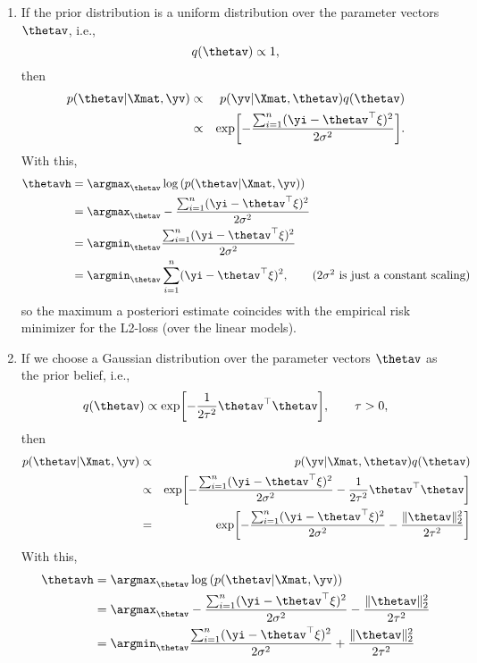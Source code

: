 \begin{enumerate}
%	
  \item  If the prior distribution is  a uniform distribution over the parameter vectors $\thetav$, i.e.,
%  
	$$  q(\thetav)  \propto 1, $$
%	
	then 
%	
	\begin{eqnarray*}
		p(\thetav | \Xmat, \yv) &\propto& p(\yv | \Xmat, \thetav) q(\thetav) \\
%		
		&\propto& \exp\biggl[-\frac{ \sum_{i=1}^n (\yi - \thetav^\top \xi)^2}{2\sigma^2}\biggr].
%		
	\end{eqnarray*}
%  
	With this, 
%	
	\begin{align*}
%				
		\thetavh 
%		
		&= \argmax_{\thetav} \log \left( p(\thetav | \Xmat, \yv) \right) \\
%		
		&= \argmax_{\thetav} -\frac{ \sum_{i=1}^n (\yi - \thetav^\top \xi)^2}{2\sigma^2} \\
%		
		&= \argmin_{\thetav}  \frac{ \sum_{i=1}^n (\yi - \thetav^\top \xi)^2}{2\sigma^2} \\
%		
		&= \argmin_{\thetav}  \sum_{i=1}^n (\yi - \thetav^\top \xi)^2, \tag{$2\sigma^2$ is just a constant scaling}
%		
	\end{align*}
%
	so the  maximum a posteriori estimate coincides with the empirical risk minimizer for the L2-loss (over the linear models).
%
  \item If we choose a Gaussian distribution over the parameter vectors $\thetav$ as the prior belief, i.e.,
  $$  q(\thetav)  \propto  \exp\biggl[ -\frac{1}{2\tau^2}\thetav^\top\thetav  \biggr], \qquad \tau>0, $$
  	then 
%  
  \begin{eqnarray*}
%  	
  	p(\thetav | \Xmat, \yv) &\propto& p(\yv | \Xmat, \thetav) q(\thetav) \\
  	&\propto& \exp\biggl[-\frac{ \sum_{i=1}^n (\yi - \thetav^\top \xi)^2}{2\sigma^2} -\frac{1}{2\tau^2}\thetav^\top\thetav \biggr] \\
%  	
	&=& \exp\biggl[-\frac{ \sum_{i=1}^n (\yi - \thetav^\top \xi)^2}{2\sigma^2} -\frac{\|\thetav\|_2^2}{2\tau^2}  \biggr]
  \end{eqnarray*}
  With this, 
  \begin{align*}
  	\thetavh 
  	&= \argmax_{\thetav} \log \left( p(\thetav | \Xmat, \yv) \right) \\
  	&= \argmax_{\thetav} -\frac{ \sum_{i=1}^n (\yi - \thetav^\top \xi)^2}{2\sigma^2} -\frac{\|\thetav\|_2^2}{2\tau^2}   \\
  	&= \argmin_{\thetav}  \frac{ \sum_{i=1}^n (\yi - \thetav^\top \xi)^2}{2\sigma^2} + \frac{\|\thetav\|_2^2}{2\tau^2}   \\

\end{align*}
\end{enumerate}
